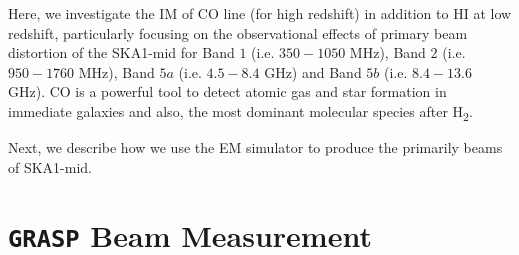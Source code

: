 Here, we investigate the IM of CO line (for high redshift) in addition to HI at low redshift, particularly focusing on the observational effects of primary beam distortion of the SKA1-mid for Band $1$ (i.e. $350 - 1050$ MHz), Band $2$ (i.e. $950 - 1760$ MHz), Band $5a$ (i.e. $4.5 - 8.4$ GHz) and Band $5b$ (i.e. $8.4 - 13.6$ GHz). CO is a powerful tool to detect atomic gas and star formation in immediate galaxies and also, the most dominant molecular species after H\textsubscript{2}.

Next, we describe how we use the EM simulator to produce the primarily beams of SKA1-mid. 
% 

\let\cleardoublepage\clearpage

\section{{\tt GRASP} Beam Measurement}			  \label{chap6:em}

